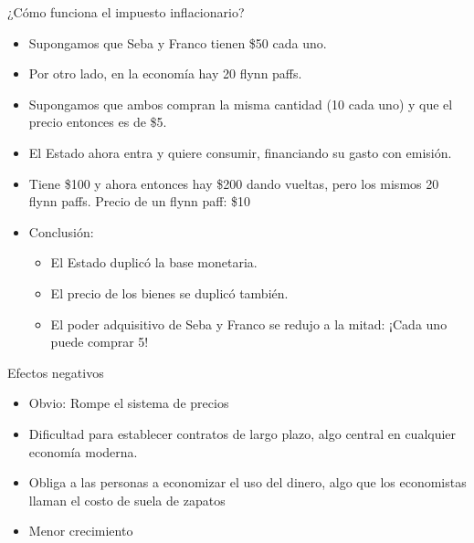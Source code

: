 \documentclass{beamer}
\begin{document}
\begin{frame}{¿Cómo funciona el impuesto inflacionario?}
    \begin{itemize}
        \item Supongamos que Seba y Franco tienen \$50 cada uno. 
        \item Por otro lado, en la economía hay 20 flynn paffs.
        \item Supongamos que ambos compran la misma cantidad (10 cada uno) y que el precio entonces es de \$5.
        \item El Estado ahora entra y quiere consumir, financiando su gasto con emisión.
        \item Tiene \$100 y ahora entonces hay \$200 dando vueltas, pero los mismos 20 flynn paffs. Precio de un flynn paff: \$10
        \item Conclusión:
        \begin{itemize}
            \item El Estado duplicó la base monetaria.
            \item El precio de los bienes se duplicó también.
            \item El poder adquisitivo de Seba y Franco se redujo a la mitad: ¡Cada uno puede comprar 5!
        \end{itemize} 
    \end{itemize}
\end{frame}

\begin{frame}{Efectos negativos}
    \begin{itemize}
        \item Obvio: Rompe el sistema de precios
        \item Dificultad para establecer contratos de largo plazo, algo central en cualquier economía moderna.
        \item  Obliga a las personas a economizar el uso del dinero, algo que los economistas llaman el costo de suela de zapatos
        \item Menor crecimiento
    \end{itemize}
\end{frame}
\end{document}
